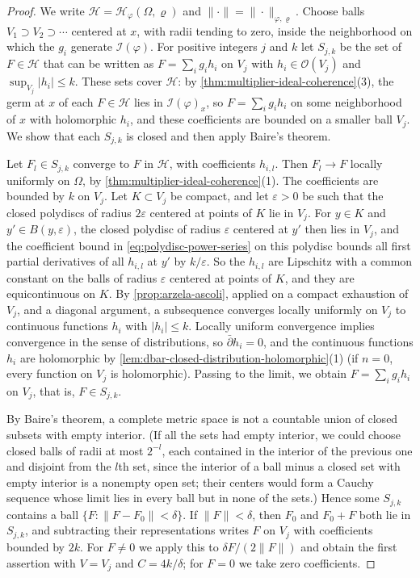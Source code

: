 \begin{proof}
We write $\mathcal H=\mathcal H_\varphi(\Omega,\varrho)$ and $\|\cdot\|=\|\cdot\|_{\varphi,\varrho}$. Choose balls $V_1\supset V_2\supset\cdots$ centered at $x$, with radii tending to zero, inside the neighborhood on which the $g_i$ generate $\mathcal I(\varphi)$. For positive integers $j$ and $k$ let $S_{j,k}$ be the set of $F\in\mathcal H$ that can be written as $F=\sum_ig_ih_i$ on $V_j$ with $h_i\in\mathcal O(V_j)$ and $\sup_{V_j}|h_i|\leq k$. These sets cover $\mathcal H$: by \cref{thm:multiplier-ideal-coherence}(3), the germ at $x$ of each $F\in\mathcal H$ lies in $\mathcal I(\varphi)_x$, so $F=\sum_ig_ih_i$ on some neighborhood of $x$ with holomorphic $h_i$, and these coefficients are bounded on a smaller ball $V_j$. We show that each $S_{j,k}$ is closed and then apply Baire's theorem.

Let $F_l\in S_{j,k}$ converge to $F$ in $\mathcal H$, with coefficients $h_{i,l}$. Then $F_l\to F$ locally uniformly on $\Omega$, by \cref{thm:multiplier-ideal-coherence}(1). The coefficients are bounded by $k$ on $V_j$. Let $K\subset V_j$ be compact, and let $\varepsilon>0$ be such that the closed polydiscs of radius $2\varepsilon$ centered at points of $K$ lie in $V_j$. For $y\in K$ and $y'\in B(y,\varepsilon)$, the closed polydisc of radius $\varepsilon$ centered at $y'$ then lies in $V_j$, and the coefficient bound in \eqref{eq:polydisc-power-series} on this polydisc bounds all first partial derivatives of all $h_{i,l}$ at $y'$ by $k/\varepsilon$. So the $h_{i,l}$ are Lipschitz with a common constant on the balls of radius $\varepsilon$ centered at points of $K$, and they are equicontinuous on $K$. By \cref{prop:arzela-ascoli}, applied on a compact exhaustion of $V_j$, and a diagonal argument, a subsequence converges locally uniformly on $V_j$ to continuous functions $h_i$ with $|h_i|\leq k$. Locally uniform convergence implies convergence in the sense of distributions, so $\bar\partial h_i=0$, and the continuous functions $h_i$ are holomorphic by \cref{lem:dbar-closed-distribution-holomorphic}(1) (if $n=0$, every function on $V_j$ is holomorphic). Passing to the limit, we obtain $F=\sum_ig_ih_i$ on $V_j$, that is, $F\in S_{j,k}$.

By Baire's theorem, a complete metric space is not a countable union of closed subsets with empty interior. (If all the sets had empty interior, we could choose closed balls of radii at most $2^{-l}$, each contained in the interior of the previous one and disjoint from the $l$th set, since the interior of a ball minus a closed set with empty interior is a nonempty open set; their centers would form a Cauchy sequence whose limit lies in every ball but in none of the sets.) Hence some $S_{j,k}$ contains a ball $\{F:\|F-F_0\|<\delta\}$. If $\|F\|<\delta$, then $F_0$ and $F_0+F$ both lie in $S_{j,k}$, and subtracting their representations writes $F$ on $V_j$ with coefficients bounded by $2k$. For $F\neq0$ we apply this to $\delta F/(2\|F\|)$ and obtain the first assertion with $V=V_j$ and $C=4k/\delta$; for $F=0$ we take zero coefficients.


\end{proof}
